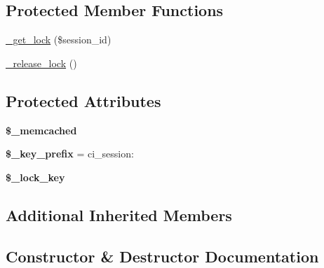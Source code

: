 \subsection*{Protected Member Functions}
\begin{DoxyCompactItemize}
\item 
\mbox{\hyperlink{class_c_i___session__memcached__driver_aad9816a84df6ffb91a5f6bc81eb2e0e0}{\+\_\+get\+\_\+lock}} (\$session\+\_\+id)
\item 
\mbox{\hyperlink{class_c_i___session__memcached__driver_aab30d34660f3c28ae03e6678a8b3a740}{\+\_\+release\+\_\+lock}} ()
\end{DoxyCompactItemize}
\subsection*{Protected Attributes}
\begin{DoxyCompactItemize}
\item 
\mbox{\label{class_c_i___session__memcached__driver_a75b0dfe4291e25f68c8d9d60e237b840}} 
{\bfseries \$\+\_\+memcached}
\item 
\mbox{\label{class_c_i___session__memcached__driver_ae6042f0fe796539c30b8679c8e596720}} 
{\bfseries \$\+\_\+key\+\_\+prefix} = \textquotesingle{}ci\+\_\+session\+:\textquotesingle{}
\item 
\mbox{\label{class_c_i___session__memcached__driver_a4787adeea6dbc52c417cefcde317bdeb}} 
{\bfseries \$\+\_\+lock\+\_\+key}
\end{DoxyCompactItemize}
\subsection*{Additional Inherited Members}


\subsection{Constructor \& Destructor Documentation}
\mbox{\label{class_c_i___session__memcached__driver_ab04d7ead65aa8da9b2258c715574b8d9}} 
